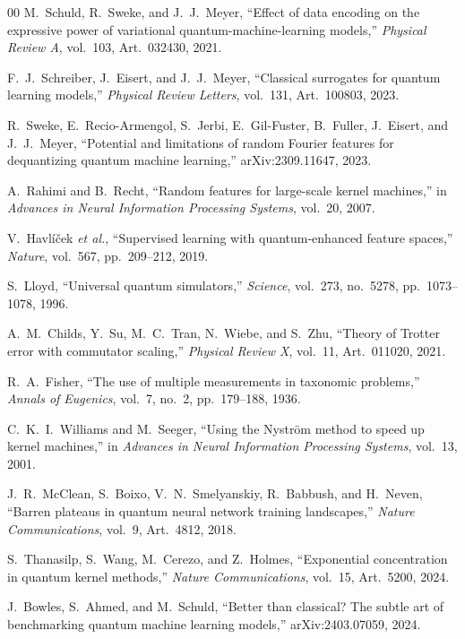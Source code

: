 \documentclass[10pt,a4paper]{article}
\begin{document}
\begin{thebibliography}{00}
M.~Schuld, R.~Sweke, and J.~J.~Meyer,
``Effect of data encoding on the expressive power of variational quantum-machine-learning models,''
\textit{Physical Review A}, vol.~103, Art.~032430, 2021.

F.~J.~Schreiber, J.~Eisert, and J.~J.~Meyer,
``Classical surrogates for quantum learning models,''
\textit{Physical Review Letters}, vol.~131, Art.~100803, 2023.

R.~Sweke, E.~Recio-Armengol, S.~Jerbi, E.~Gil-Fuster, B.~Fuller, J.~Eisert, and J.~J.~Meyer,
``Potential and limitations of random Fourier features for dequantizing quantum machine learning,''
arXiv:2309.11647, 2023.

A.~Rahimi and B.~Recht,
``Random features for large-scale kernel machines,''
in \textit{Advances in Neural Information Processing Systems}, vol.~20, 2007.

V.~Havl\'{i}\v{c}ek \textit{et al.},
``Supervised learning with quantum-enhanced feature spaces,''
\textit{Nature}, vol.~567, pp.~209--212, 2019.

S.~Lloyd,
``Universal quantum simulators,''
\textit{Science}, vol.~273, no.~5278, pp.~1073--1078, 1996.

A.~M.~Childs, Y.~Su, M.~C.~Tran, N.~Wiebe, and S.~Zhu,
``Theory of Trotter error with commutator scaling,''
\textit{Physical Review X}, vol.~11, Art.~011020, 2021.

R.~A.~Fisher,
``The use of multiple measurements in taxonomic problems,''
\textit{Annals of Eugenics}, vol.~7, no.~2, pp.~179--188, 1936.

C.~K.~I.~Williams and M.~Seeger,
``Using the Nystr\"om method to speed up kernel machines,''
in \textit{Advances in Neural Information Processing Systems}, vol.~13, 2001.

J.~R.~McClean, S.~Boixo, V.~N.~Smelyanskiy, R.~Babbush, and H.~Neven,
``Barren plateaus in quantum neural network training landscapes,''
\textit{Nature Communications}, vol.~9, Art.~4812, 2018.

S.~Thanasilp, S.~Wang, M.~Cerezo, and Z.~Holmes,
``Exponential concentration in quantum kernel methods,''
\textit{Nature Communications}, vol.~15, Art.~5200, 2024.

J.~Bowles, S.~Ahmed, and M.~Schuld,
``Better than classical? The subtle art of benchmarking quantum machine learning models,''
arXiv:2403.07059, 2024.
\end{thebibliography}\endgroup
\end{document}

